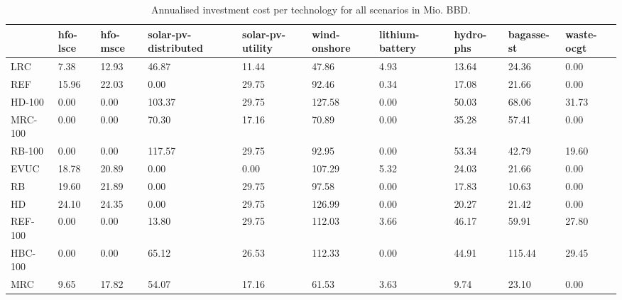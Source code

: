 \begin{table}
\centering
\caption{Annualised investment cost per technology for all scenarios in Mio. BBD.}
\label{tab:investment_cost}
\begin{tabular}{lp{1.2cm}p{1.2cm}p{1.2cm}p{1.2cm}p{1.2cm}p{1.2cm}p{1.2cm}p{1.2cm}p{1.2cm}}
\toprule
{} &  hfo-lsce &  hfo-msce &  solar-pv-distributed &  solar-pv-utility &  wind-onshore &  lithium-battery &  hydro-phs &  bagasse-st &  waste-ocgt \\
\midrule
LRC      &      7.38 &     12.93 &                 46.87 &             11.44 &         47.86 &             4.93 &      13.64 &       24.36 &        0.00 \\
REF      &     15.96 &     22.03 &                  0.00 &             29.75 &         92.46 &             0.34 &      17.08 &       21.66 &        0.00 \\
HD-100   &      0.00 &      0.00 &                103.37 &             29.75 &        127.58 &             0.00 &      50.03 &       68.06 &       31.73 \\
MRC-100  &      0.00 &      0.00 &                 70.30 &             17.16 &         70.89 &             0.00 &      35.28 &       57.41 &        0.00 \\
RB-100   &      0.00 &      0.00 &                117.57 &             29.75 &         92.95 &             0.00 &      53.34 &       42.79 &       19.60 \\
EVUC     &     18.78 &     20.89 &                  0.00 &              0.00 &        107.29 &             5.32 &      24.03 &       21.66 &        0.00 \\
RB       &     19.60 &     21.89 &                  0.00 &             29.75 &         97.58 &             0.00 &      17.83 &       10.63 &        0.00 \\
HD       &     24.10 &     24.35 &                  0.00 &             29.75 &        126.99 &             0.00 &      20.27 &       21.42 &        0.00 \\
REF-100  &      0.00 &      0.00 &                 13.80 &             29.75 &        112.03 &             3.66 &      46.17 &       59.91 &       27.80 \\
HBC-100  &      0.00 &      0.00 &                 65.12 &             26.53 &        112.33 &             0.00 &      44.91 &      115.44 &       29.45 \\
MRC      &      9.65 &     17.82 &                 54.07 &             17.16 &         61.53 &             3.63 &       9.74 &       23.10 &        0.00 \\

\end{tabular}
\end{table}

